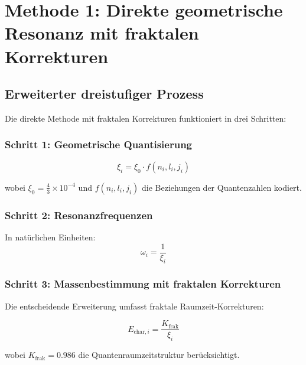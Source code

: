 \documentclass[12pt,a4paper]{article}
\begin{document}
\section{Methode 1: Direkte geometrische Resonanz mit fraktalen Korrekturen}
\label{sec:direct_geometric_method}

\subsection{Erweiterter dreistufiger Prozess}
\label{subsec:enhanced_process}

Die direkte Methode mit fraktalen Korrekturen funktioniert in drei Schritten:

\subsubsection{Schritt 1: Geometrische Quantisierung}
\label{subsubsec:step1_enhanced}

\begin{equation}
	\xi_i = \xi_0 \cdot f(n_i, l_i, j_i)
	\label{eq:geometric_quantization_enhanced}
\end{equation}

wobei $\xi_0 = \frac{4}{3} \times 10^{-4}$ und $f(n_i, l_i, j_i)$ die Beziehungen der Quantenzahlen kodiert.

\subsubsection{Schritt 2: Resonanzfrequenzen}
\label{subsubsec:step2_enhanced}

In nat\"u{}rlichen Einheiten:
\begin{equation}
	\omega_i = \frac{1}{\xi_i}
	\label{eq:resonance_natural_enhanced}
\end{equation}

\subsubsection{Schritt 3: Massenbestimmung mit fraktalen Korrekturen}
\label{subsubsec:step3_enhanced}

Die entscheidende Erweiterung umfasst fraktale Raumzeit-Korrekturen:

\begin{equation}
	\boxed{E_{\text{char},i} = \frac{K_{\text{frak}}}{\xi_i}}
	\label{eq:characteristic_energy_direct_enhanced}
\end{equation}

wobei $K_{\text{frak}} = 0.986$ die Quantenraumzeitstruktur ber\"u{}cksichtigt.
\end{document}
